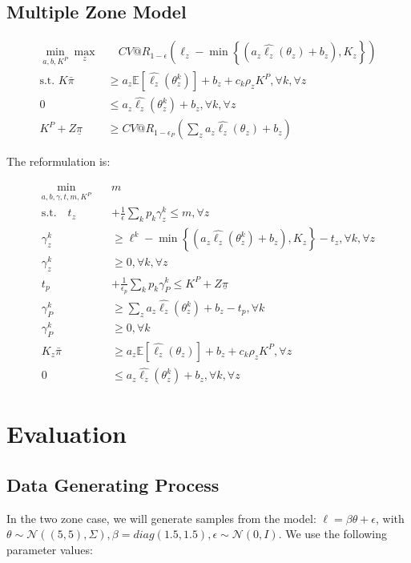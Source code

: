 \documentclass[11pt]{article}
\begin{document}
    \subsection*{Multiple Zone Model}
    
    \begin{align}
        \min_{a,b,K^P} \max_z &\quad CV@R_{1-\epsilon}(\ell_z - \min\left\{(a_z\hat{\ell_z}(\theta_z) + b_z), K_z\right\})\\
        \text{s.t.   } K\bar{\pi} &\geq a_z \mathbb{E}[\hat{\ell_z}(\theta^k_z)] + b_z + c_k\rho_z K^P,  \forall k, \forall z\\
        0 &\leq a_z\hat{\ell_z}(\theta^k_z) + b_z, \forall k, \forall z \\
        K^P + Z\underline{\pi} &\geq CV@R_{1-\epsilon_P}\left( \sum_z a_z \hat{\ell_z}(\theta_z) + b_z \right)
    \end{align}
    
    The reformulation is: 
    
    \begin{align}
        \min_{a,b,\gamma,t,m,K^P} \quad & m\\
        \text{s.t.} \quad t_z &+ \frac{1}{\epsilon} \sum_k p_k \gamma_z^k \leq m, \forall z\\
        \gamma_z^k &\geq \ell^k - \min\left\{(a_z\hat{\ell_z}(\theta_z^k) + b_z), K_z\right\} -t_z, \forall k, \forall z \\
        \gamma_z^k &\geq 0, \forall k, \forall z\\
        t_p &+ \frac{1}{\epsilon_p} \sum_k p_k \gamma_P^k \leq K^P+Z\underline{\pi}\\
        \gamma_P^k &\geq \sum_z a_z \hat{\ell_z}(\theta^k_z) + b_z -t_p, \forall k \\
        \gamma_P^k &\geq 0, \forall k\\
        K_z\bar{\pi} &\geq a_z \mathbb{E}[\hat{\ell_z}(\theta_z)] + b_z + c_k \rho_z K^P, \forall z \\
        0 &\leq a_z \hat{\ell_z}(\theta_z^k) + b_z, \forall k, \forall z
    \end{align}
    
\section{Evaluation}
\subsection*{Data Generating Process}
    In the two zone case, we will generate samples from the model: $\ell = \beta \theta + \epsilon$, with $\theta \sim \mathcal{N}((5,5),\Sigma), \beta = diag(1.5,1.5), \epsilon \sim \mathcal{N}(0,I)$. We use the following parameter values: 
\end{document}
